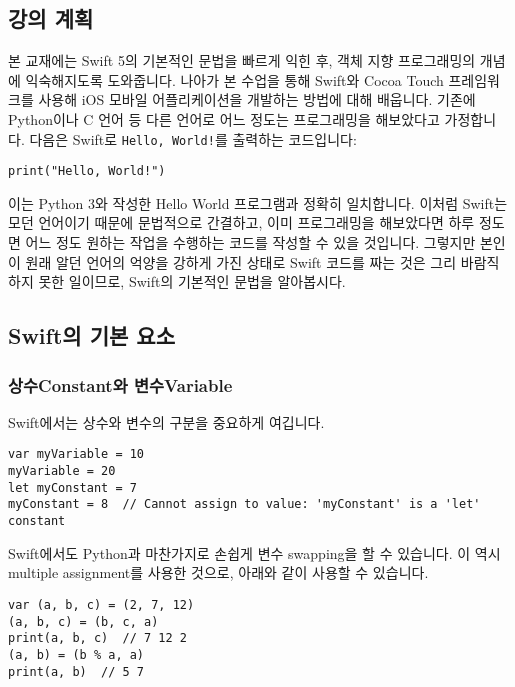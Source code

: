 \documentclass[../main.tex]{subfiles}
\begin{document}
\subsection{강의 계획}
본 교재에는 Swift 5의 기본적인 문법을 빠르게 익힌 후, 객체 지향 프로그래밍의
개념에 익숙해지도록 도와줍니다.
나아가 본 수업을 통해 Swift와 Cocoa Touch 프레임워크를 사용해 iOS 모바일
어플리케이션을 개발하는 방법에 대해 배웁니다.
기존에 Python이나 C 언어 등 다른 언어로 어느 정도는 프로그래밍을 해보았다고
가정합니다.
다음은 Swift로 \texttt{Hello, World!}를 출력하는 코드입니다:
\begin{verbatim}
print("Hello, World!")
\end{verbatim}
이는 Python 3와 작성한 Hello World 프로그램과 정확히 일치합니다.
이처럼 Swift는 모던 언어이기 때문에 문법적으로 간결하고, 이미 프로그래밍을
해보았다면 하루 정도면 어느 정도 원하는 작업을 수행하는 코드를 작성할 수 있을
것입니다.
그렇지만 본인이 원래 알던 언어의 억양을 강하게 가진 상태로 Swift 코드를 짜는
것은 그리 바람직하지 못한 일이므로, Swift의 기본적인 문법을 알아봅시다.

\subsection{Swift의 기본 요소}
\subsubsection{상수Constant와 변수Variable}
Swift에서는 상수와 변수의 구분을 중요하게 여깁니다.
\begin{verbatim}
var myVariable = 10
myVariable = 20
let myConstant = 7
myConstant = 8  // Cannot assign to value: 'myConstant' is a 'let' constant
\end{verbatim}

Swift에서도 Python과 마찬가지로 손쉽게 변수 swapping을 할 수 있습니다.
이 역시 multiple assignment를 사용한 것으로, 아래와 같이 사용할 수 있습니다.
\begin{verbatim}
var (a, b, c) = (2, 7, 12)
(a, b, c) = (b, c, a)
print(a, b, c)  // 7 12 2
(a, b) = (b % a, a)
print(a, b)  // 5 7
\end{verbatim}
\end{document}
